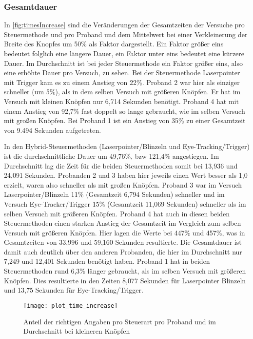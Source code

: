 \subsubsection{Gesamtdauer}
In \autoref{fig:timesIncrease} sind die Veränderungen der Gesamtzeiten der Versuche pro Steuermethode und pro Proband und dem Mittelwert bei einer Verkleinerung der Breite des Knopfes um 50\% als Faktor dargestellt. Ein Faktor größer eins bedeutet folglich eine längere Dauer, ein Faktor unter eins bedeutet eine kürzere Dauer. Im Durchschnitt ist bei jeder Steuermethode ein Faktor größer eins, also eine erhöhte Dauer pro Versuch, zu sehen. Bei der Steuermethode Laserpointer mit Trigger kam es zu einem Anstieg von 22\%. Proband 2 war hier als einziger schneller (um 5\%), als in dem selben Versuch mit größeren Knöpfen. Er hat im Versuch mit kleinen Knöpfen nur 6,714 Sekunden benötigt. Proband 4 hat mit einem Anstieg von 92,7\% fast doppelt so lange gebraucht, wie im selben Versuch mit großen Knöpfen. Bei Proband 1 ist ein Anstieg von 35\% zu einer Gesamtzeit von 9.494 Sekunden aufgetreten.

In den Hybrid-Steuermethoden (Laserpointer/Blinzeln und Eye-Tracking/Trigger) ist die durchschnittliche Dauer um 49,76\%, bzw 121,4\% angestiegen. Im Durchschnitt lag die Zeit für die beiden Steuermethoden somit bei 13,936  und 24,091 Sekunden. Probanden 2 und 3 haben hier jeweils einen Wert besser als 1,0 erzielt, waren also schneller als mit großen Knöpfen. Proband 3 war im Versuch Laserpointer/Blinzeln 11\% (Gesamtzeit 6,794 Sekunden) schneller und im Versuch Eye-Tracker/Trigger 15\% (Gesamtzeit 11,069 Sekunden) schneller als im selben Versuch mit größeren Knöpfen. Proband 4 hat auch in diesen beiden Steuermethoden einen starken Anstieg der Gesamtzeit im Vergleich zum selben Versuch mit größeren Knöpfen. Hier lagen die Werte bei 447\% und 457\%, was in Gesamtzeiten von 33,996 und 59,160 Sekunden resultierte. Die Gesamtdauer ist damit auch deutlich über den anderen Probanden, die hier im Durchschnitt nur 7,249 und 12,401 Sekunden benötigt haben. Proband 1 hat in beiden Steuermethoden rund 6,3\% länger gebraucht, als im selben Versuch mit größeren Knöpfen. Dies resultierte in den Zeiten 8,077 Sekunden für Laserpointer Blinzeln und 13,75 Sekunden für Eye-Tracking/Trigger.

\begin{figure}[!htbp]
	\centering
	\texttt{[image: plot\_time\_increase]}
	\caption[Anteil der richtigen Angaben pro Steuerart pro Proband und im Durchschnitt bei kleineren Knöpfen]{Anteil der richtigen Angaben pro Steuerart pro Proband und im Durchschnitt bei kleineren Knöpfen}
	\label{fig:timesIncrease}
\end{figure}

